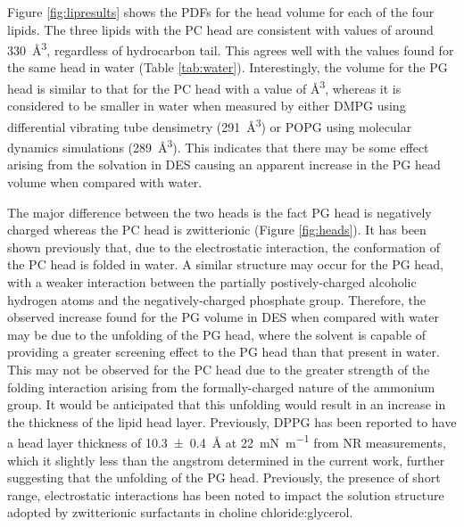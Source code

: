 \documentclass[%
 reprint,
 amsmath,amssymb,
 prl,
]{revtex4-1}
\begin{document}
Figure \ref{fig:lipresults} shows the PDFs for the head volume for each of the four lipids.
The three lipids with the PC head are consistent with values of around \SI{330}{\cubic\angstrom}, regardless of hydrocarbon tail.
This agrees well with the values found for the same head in water (Table \ref{tab:water}).
Interestingly, the volume for the PG head is similar to that for the PC head with a value of \si{\cubic\angstrom}, whereas it is considered to be smaller in water when measured by either DMPG using differential vibrating tube densimetry\cite{Pan2012} (\SI{291}{\cubic\angstrom}) or POPG using molecular dynamics simulations\cite{Kucerka2012} (\SI{289}{\cubic\angstrom}).
This indicates that there may be some effect arising from the solvation in DES causing an apparent increase in the PG head volume when compared with water.

The major difference between the two heads is the fact PG head is negatively charged whereas the PC head is zwitterionic (Figure \ref{fig:heads}).
It has been shown previously that, due to the electrostatic interaction, the conformation of the PC head is folded in water\cite{Gilliams2016}.
A similar structure may occur for the PG head, with a weaker interaction between the partially postively-charged alcoholic hydrogen atoms and the negatively-charged phosphate group.
Therefore, the observed increase found for the PG volume in DES when compared with water may be due to the unfolding of the PG head, where the solvent is capable of providing a greater screening effect to the PG head than that present in water.
This may not be observed for the PC head due to the greater strength of the folding interaction arising from the formally-charged nature of the ammonium group.
It would be anticipated that this unfolding would result in an increase in the thickness of the lipid head layer.
Previously, DPPG has been reported to have a head layer thickness of \SI[separate-uncertainty=true]{10.3\pm0.4}{\angstrom} at \SI{22}{\milli\newton\per\meter} from NR measurements\cite{Clifton2012}, which it slightly less than the \si{angstrom} determined in the current work, further suggesting that the unfolding of the PG head.
Previously, the presence of short range, electrostatic interactions has been noted to impact the solution structure adopted by zwitterionic surfactants in choline chloride:glycerol\cite{Sanchez-Fernandez2018}.
\end{document}
